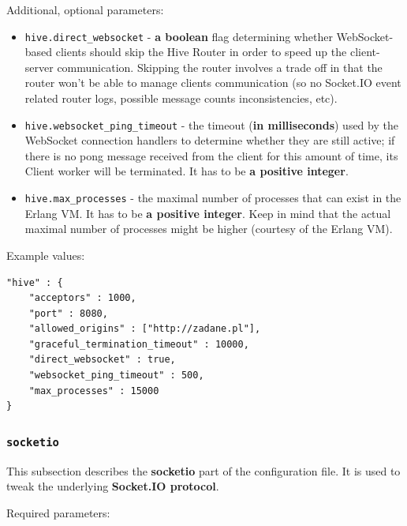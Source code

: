 \documentclass[a4paper]{article}
\begin{document}
\noindent
Additional, optional parameters:


\begin{itemize}
\item \texttt{hive.direct\_websocket} - \textbf{a boolean} flag determining whether WebSocket-based clients should skip the Hive Router in order to speed up the client-server communication. Skipping the router involves a trade off in that the router won't be able to manage clients communication (so no Socket.IO event related router logs, possible message counts inconsistencies, etc).
\item \texttt{hive.websocket\_ping\_timeout} - the timeout (\textbf{in milliseconds}) used by the  WebSocket connection handlers to determine whether they are still active; if there is no pong message received from the client for this amount of time, its Client worker will be terminated. It has to be \textbf{a positive integer}.
\item \texttt{hive.max\_processes} - the maximal number of processes that can exist in the Erlang VM. It has to be \textbf{a positive integer}. Keep in mind that the actual maximal number of processes might be higher (courtesy of the Erlang VM).
\end{itemize}

\noindent
Example values:


\begin{verbatim}
"hive" : {
    "acceptors" : 1000,
    "port" : 8080,
    "allowed_origins" : ["http://zadane.pl"],
    "graceful_termination_timeout" : 10000,
    "direct_websocket" : true,
    "websocket_ping_timeout" : 500,
    "max_processes" : 15000
}
\end{verbatim}
\subsubsection{\texttt{socketio}}
\label{sec-3-1-2}

This subsection describes the \textbf{socketio} part of the configuration file. It is used to tweak the underlying \textbf{Socket.IO protocol}.

\noindent
Required parameters:
\end{document}
